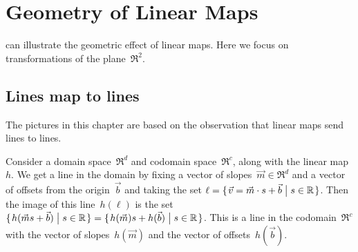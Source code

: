\chapter{Geometry of Linear Maps}

\Sage{} can illustrate the geometric effect of linear maps.
Here we focus on transformations of the plane~$\Re^2$.  




\section{Lines map to lines}
The pictures in this chapter are 
based on the observation that linear maps send lines to lines.

Consider a domain space~$\Re^d$ and codomain space~$\Re^c$, along with
the linear map~$h$.
We get a line in the domain by fixing a vector of slopes~$\vec{m}\in\Re^d$
and a vector of offsets from the origin~$\vec{b}$ and taking the set 
$\ell = \mbox{$\{\hspace{0.1em}\vec{v}=\vec{m}\cdot s +\vec{b}\bigm| s\in\mathbb{R}\hspace{0.1em}\}$}$.
Then the image of this line~$h(\ell)$ is the set 
$\mbox{$\{\hspace{0.1em}h(\vec{m}s+\vec{b})\bigm| s\in\mathbb{R}\hspace{0.1em}\}$}
=\mbox{$\{\hspace{0.1em}h(\vec{m})s+h(\vec{b})\bigm| s\in\mathbb{R}\hspace{0.1em}\}$}$.
This is a line in the codomain~$\Re^c$ with the vector of 
slopes~$h(\vec{m})$ and the vector of offsets~$h(\vec{b})$. 

